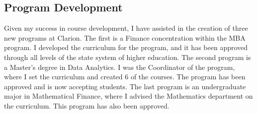 \documentclass[12pt]{article}
\begin{document}
\subsection{Program Development}
Given my success in course development, I have assisted in the creation of three new programs at Clarion. The first is a Finance concentration within the MBA program.  I developed the curriculum for the program, and it has been approved through all levels of the state system of higher education.  The second program is a Master's degree in Data Analytics. I was the Coordinator of the program, where I set the curriculum and created 6 of the courses.  The program has been approved and is now accepting students.  The last program is an undergraduate major in Mathematical Finance, where I advised the Mathematics department on the curriculum.  This program has also been approved. 
\end{document}
